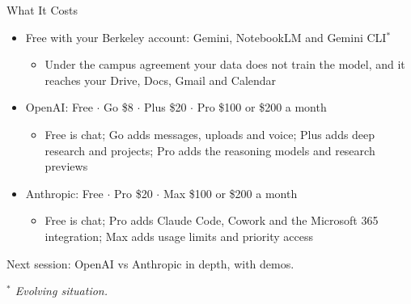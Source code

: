 \documentclass[aspectratio=169]{beamer}
\begin{document}
\begin{frame}{What It Costs}
    \begin{itemize}\setlength{\itemsep}{6pt}
        \item Free with your Berkeley account: Gemini, NotebookLM and Gemini CLI$^{*}$
        \begin{itemize}
            \item Under the campus agreement your data does not train the model, and it
                  reaches your Drive, Docs, Gmail and Calendar
        \end{itemize}
        \item OpenAI: Free $\cdot$ Go \$8 $\cdot$ Plus \$20 $\cdot$ Pro \$100 or \$200 a month
        \begin{itemize}
            \item Free is chat; Go adds messages, uploads and voice; Plus adds deep research
                  and projects; Pro adds the reasoning models and research previews
        \end{itemize}
        \item Anthropic: Free $\cdot$ Pro \$20 $\cdot$ Max \$100 or \$200 a month
        \begin{itemize}
            \item Free is chat; Pro adds Claude Code, Cowork and the Microsoft 365
                  integration; Max adds usage limits and priority access
        \end{itemize}
    \end{itemize}

    \vspace{0.8em}
    \begin{center}
    Next session: OpenAI vs Anthropic in depth, with demos.
    \end{center}

    \vspace{0.4em}
    {\small\itshape $^{*}$ Evolving situation.}
\end{frame}
\end{document}
